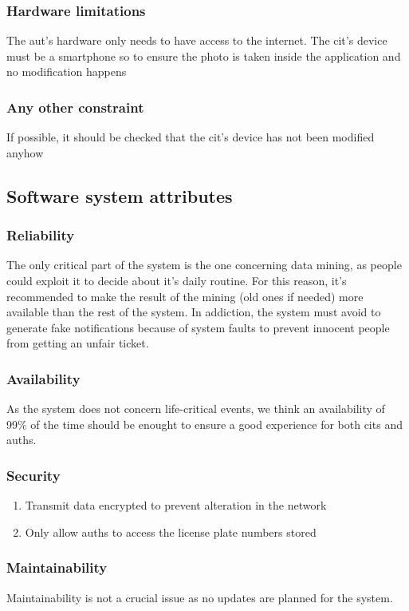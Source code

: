 \documentclass{article}
\begin{document}
		\subsubsection{Hardware limitations} The aut's hardware only needs to have access to the internet. The cit's device must be a smartphone so to ensure the photo is taken inside the application and no modification happens
		\subsubsection{Any other constraint} If possible, it should be checked that the cit's device has not been modified anyhow
	\subsection{Software system attributes}
		\subsubsection{Reliability}
			The only critical part of the system is the one concerning data mining, as people could exploit it to decide about it's daily routine. For this reason, it's recommended to make the result of the mining (old ones if needed) more available than the rest of the system.
			In addiction, the system must avoid to generate fake notifications because of system faults to prevent innocent people from getting an unfair ticket.
		\subsubsection{Availability}
			As the system does not concern life-critical events, we think an availability of 99\% of the time should be enought to ensure a good experience for both cits and auths.
		\subsubsection{Security}
			\begin{enumerate}
				\item Transmit data encrypted to prevent alteration in the network
				\item Only allow auths to access the license plate numbers stored
			\end{enumerate}
		\subsubsection{Maintainability}
			Maintainability is not a crucial issue as no updates are planned for the system.
\end{document}
